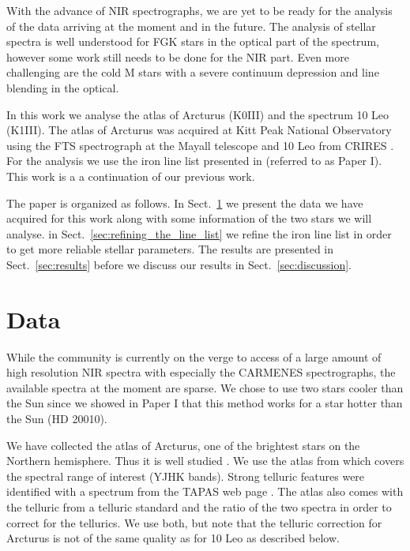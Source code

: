 \documentclass{aa}
\begin{document}
With the advance of NIR spectrographs, we are yet to be ready for the analysis
of the data arriving at the moment and in the future. The analysis of stellar
spectra is well understood for FGK stars in the optical part of the spectrum,
however some work still needs to be done for the NIR part. Even more challenging
are the cold M stars with a severe continuum depression and line blending in the
optical.

In this work we analyse the atlas of Arcturus (K0III) and the spectrum 10 Leo
(K1III). The atlas of Arcturus was acquired at Kitt Peak National Observatory
using the FTS spectrograph at the Mayall telescope \citep{Hinkle2003} and 10 Leo
from CRIRES \citep{Nicholls2016}. For the analysis we use the iron line list
presented in \citet{Andreasen2016} (referred to as Paper I). This work is a a
continuation of our previous work.

The paper is organized as follows. In Sect.~\ref{sec:data} we present the data
we have acquired for this work along with some information of the two stars we
will analyse. in Sect.~\ref{sec:refining_the_line_list} we refine the iron line
list in order to get more reliable stellar parameters. The results are presented
in Sect.~\ref{sec:results} before we discuss our results in
Sect.~\ref{sec:discussion}.




\section{Data}
\label{sec:data}

While the community is currently on the verge to access of a large amount of
high resolution NIR spectra with especially the CARMENES spectrographs, the
available spectra at the moment are sparse. We chose to use two stars cooler
than the Sun since we showed in Paper I that this method works for
a star hotter than the Sun (HD 20010).

We have collected the atlas of Arcturus, one of the brightest stars on the
Northern hemisphere. Thus it is well studied
\citep[see e.g.][to mention just a few]{Griffin1967,McWilliam1990,Ramirez2013}. We
use the atlas from \cite{Hinkle2003} which covers the spectral range of interest
(YJHK bands). Strong telluric features were identified with a spectrum from the
TAPAS web page \citep{Bertaux2014}. The atlas also comes with the telluric from
a telluric standard and the ratio of the two spectra in order to correct for the
tellurics. We use both, but note that the telluric correction for Arcturus is
not of the same quality as for 10 Leo as described below.
\end{document}
